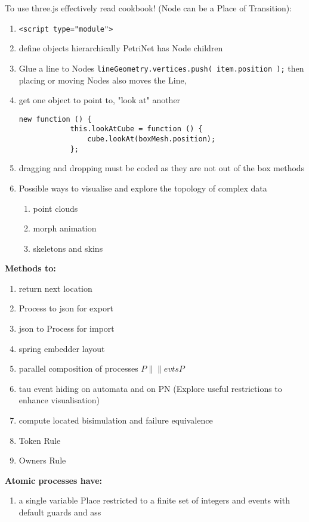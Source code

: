 To use three.js effectively read cookbook! (Node can be a Place of Transition):
\begin{enumerate}
\item \verb|<script type="module"> |
\item define objects hierarchically  PetriNet has Node children 
\item  Glue a line to Nodes \verb|lineGeometry.vertices.push( item.position );|  then placing or moving Nodes also moves the Line,
\item get one object to point to, "look at" another 
\begin{verbatim}
new function () {
            this.lookAtCube = function () {
                cube.lookAt(boxMesh.position);
            };
\end{verbatim}
\item dragging and dropping must be coded as they are not out of the box methods
\item Possible  ways to visualise and explore the topology of complex data

\begin{enumerate}
\item point clouds
\item morph animation
\item skeletons and skins
\end{enumerate}


\end{enumerate}

{\bf Methods to:}
\begin{enumerate}
 \item    return next location
 \item    Process  to json for  export
 \item    json to Process for import
 \item    spring embedder layout
 \item    parallel composition of processes  $P \|\|{evts} P$
 \item    tau event hiding on automata and on PN (Explore useful restrictions to enhance visualisation)
 \item    compute located bisimulation and failure equivalence
  \item   Token Rule
 \item    Owners Rule
     \end{enumerate}
     
{\bf Atomic processes have:}
\begin{enumerate}
 \item     a single variable Place restricted to a finite set of integers and 
     events with default guards and ass
\end{enumerate}

